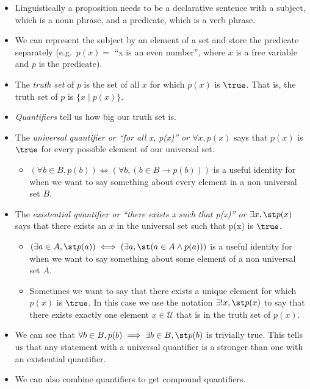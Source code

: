 \begin{itemize}
\tightlist
\item
  Linguistically a proposition needs to be a declarative sentence with a
  subject, which is a noun phrase, and a predicate, which is a verb
  phrase.
\item
  We can represent the subject by an element of a set and store the
  predicate separately (e.g.~\(p(x) =\) ``x is an even number'', where
  \(x\) is a free variable and \(p\) is the predicate).
\item
  The \emph{truth set} of \(p\) is the set of all \(x\) for which
  \(p(x)\) is \(\true\). That is, the truth set of \(p\) is
  \(\{x \mid p(x)\}\).
\item
  \emph{Quantifiers} tell us how big our truth set is.
\item
  The \emph{universal quantifier or ``for all x, p(x)'' or
  \(\forall x, p(x)\)} says that \(p(x)\) is \(\true\) for every
  possible element of our universal set.

  \begin{itemize}
  \tightlist
  \item
    \((\forall b \in B, p(b)) \iff (\forall b, (b \in B \to p(b)))\) is
    a useful identity for when we want to say something about every
    element in a non universal set \(B\).
  \end{itemize}
\item
  The \emph{existential quantifier or ``there exists x such that p(x)''
  or \(\exists x, \st p(x)\)} says that there exists an \(x\) in the
  universal set such that p(x) is \(\true\).

  \begin{itemize}
  \tightlist
  \item
    \((\exists a \in A, \st p(a)) \iff (\exists a, \st (a \in A \land p(a)))\)
    is a useful identity for when we want to say something about some
    element of a non universal set \(A\).
  \item
    Sometimes we want to say that there exists a unique element for
    which \(p(x)\) is \(\true\). In this case we use the notation
    \(\exists! x, \st p(x)\) to say that there exists exactly one
    element \(x \in \mathcal{U}\) that is in the truth set of \(p(x)\).
  \end{itemize}
\item
  We can see that
  \(\forall b \in B, p(b) \implies \exists b \in B, \st p(b)\) is
  trivially true. This tells us that any statement with a universal
  quantifier is a stronger than one with an existential quantifier.
\item
  We can also combine quantifiers to get compound quantifiers.


\end{itemize}
